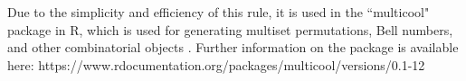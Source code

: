 Due to the simplicity and efficiency of this rule, it is used in the ``multicool" package in R, which is used for generating multiset permutations, Bell numbers, and other combinatorial objects \cite{multicool_2021}.   Further information on the package is available here: https://www.rdocumentation.org/packages/multicool/versions/0.1-12




